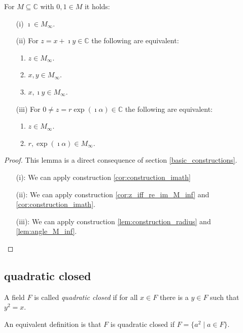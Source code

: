 \begin{lemma}
    \label{lem:M_inf_properties}
    \leanok
    For $M\subseteq \mathbb{C}$ with $0,1 \in M$ it holds:
    \begin{itemize}
        \item[(i)] $\imath \in M_{\infty}$.
        \item[(ii)] For $z = x + \imath y \in \mathbb{C}$ the following are equivalent:
            \begin{enumerate}
                \item $z \in M_{\infty}$.
                \item $x, y \in M_{\infty}$.
                \item $x, \imath y \in M_{\infty}$.
            \end{enumerate}
        \item[(iii)] 
            For $0 \ne z = r \exp(\imath \alpha) \in \mathbb{C}$ the following are equivalent:
            \begin{enumerate}
                \item $z \in M_{\infty}$.
                \item $r,\exp(\imath \alpha) \in M_{\infty}$.
            \end{enumerate}
    \end{itemize}
\end{lemma}
\begin{proof}
    \leanok
    This lemma is a direct consequence of section \ref{basic_constructions}.
    \begin{itemize}
        \item[(i):] We can apply construction \ref{cor:construction_imath}
        \item[(ii):] We can apply construction \ref{cor:z_iff_re_im_M_inf} and \ref{cor:construction_imath}.
        \item[(iii):]  We can apply construction \ref{lem:construction_radius} and \ref{lem:angle_M_inf}.
    \end{itemize}
\end{proof}

\subsection*{quadratic closed}
\begin{definition}
    \label{def:quadritc_closed_field}
    \leanok
    A field $F$ is called \emph{quadratic closed} if for all $x \in F$ there is a $y \in F$ such that $y^2 = x$.
\end{definition}
\begin{remark}
    An equivalent definition is that $F$ is quadratic closed if $F=\{a^2\mid a \in F\}$.
\end{remark}

